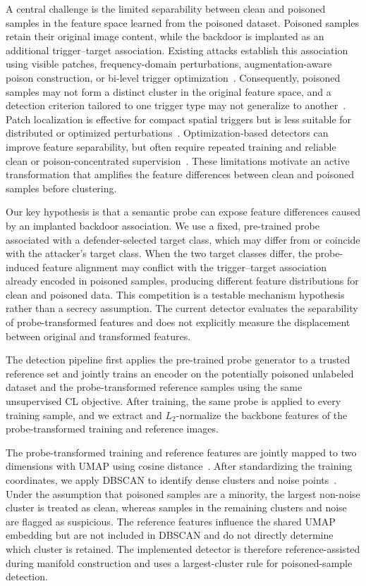 \documentclass[10pt,journal]{IEEEtran}
\begin{document}
A central challenge is the limited separability between clean and poisoned samples in the feature space learned from the poisoned dataset. Poisoned samples retain their original image content, while the backdoor is implanted as an additional trigger--target association. Existing attacks establish this association using visible patches, frequency-domain perturbations, augmentation-aware poison construction, or bi-level trigger optimization~\cite{Saha2022SSLBackdoor,Li2023CTRL,Zhang2024CorruptEncoder,Sun2024BLTO}. Consequently, poisoned samples may not form a distinct cluster in the original feature space, and a detection criterion tailored to one trigger type may not generalize to another~\cite{Pan2023ASSET,Li2024Difficulty}. Patch localization is effective for compact spatial triggers but is less suitable for distributed or optimized perturbations~\cite{Tejankar2023PatchSearch}. Optimization-based detectors can improve feature separability, but often require repeated training and reliable clean or poison-concentrated supervision~\cite{Qi2023Proactive,Pan2023ASSET,Chen2025AUTO}. These limitations motivate an active transformation that amplifies the feature differences between clean and poisoned samples before clustering.

Our key hypothesis is that a semantic probe can expose feature differences caused by an implanted backdoor association. We use a fixed, pre-trained probe associated with a defender-selected target class, which may differ from or coincide with the attacker's target class. When the two target classes differ, the probe-induced feature alignment may conflict with the trigger--target association already encoded in poisoned samples, producing different feature distributions for clean and poisoned data. This competition is a testable mechanism hypothesis rather than a secrecy assumption. The current detector evaluates the separability of probe-transformed features and does not explicitly measure the displacement between original and transformed features.

The detection pipeline first applies the pre-trained probe generator to a trusted reference set and jointly trains an encoder on the potentially poisoned unlabeled dataset and the probe-transformed reference samples using the same unsupervised CL objective. After training, the same probe is applied to every training sample, and we extract and $L_2$-normalize the backbone features of the probe-transformed training and reference images.

The probe-transformed training and reference features are jointly mapped to two dimensions with UMAP using cosine distance~\cite{McInnes2018UMAP}. After standardizing the training coordinates, we apply DBSCAN to identify dense clusters and noise points~\cite{Ester1996DBSCAN}. Under the assumption that poisoned samples are a minority, the largest non-noise cluster is treated as clean, whereas samples in the remaining clusters and noise are flagged as suspicious. The reference features influence the shared UMAP embedding but are not included in DBSCAN and do not directly determine which cluster is retained. The implemented detector is therefore reference-assisted during manifold construction and uses a largest-cluster rule for poisoned-sample detection.
\end{document}
